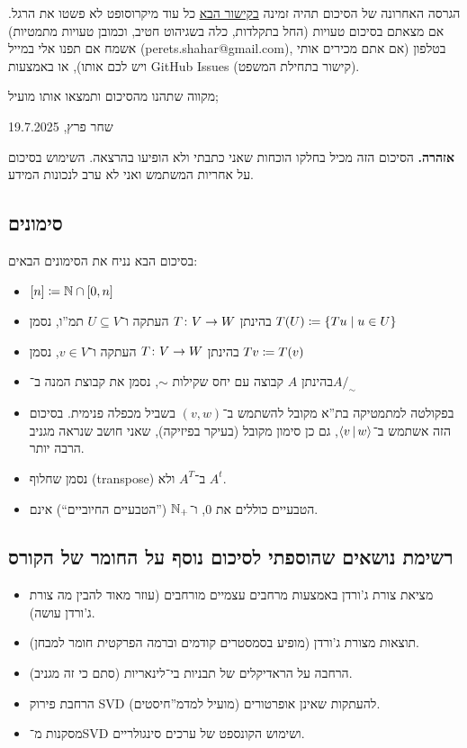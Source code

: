 \documentclass[name=רשימות אלגברה לינארית 2א]{../../../tex/classes/megasumPreamble}
\begin{document}
	הגרסה האחרונה של הסיכום תהיה זמינה \href{https://github.com/Sh-Pe/cs-tau-shpe/tree/master/src/lin-2A/megasum/lin2Amegasum.pdf}{בקישור הבא} כל עוד מיקרוסופט לא פשטו את הרגל. אם מצאתם בסיכום טעויות (החל בתקלדות, כלה בשגיהוט חטיב, וכמובן טעויות מתמטיות) אשמח אם תפנו אלי במייל (perets.shahar@gmail.com), בטלפון (אם אתם מכירים אותי ויש לכם אותו), או באמצעות GitHub Issues (קישור בתחילת המשפט). 
	
	מקווה שתהנו מהסיכום ותמצאו אותו מועיל; 
	
	\hfill שחר פרץ, 19.7.2025
	
	
	\textbf{אזהרה. }הסיכום הזה מכיל בחלקו הוכחות שאני כתבתי ולא הופיעו בהרצאה. השימוש בסיכום על אחריות המשתמש ואני לא ערב לנכונות המידע. 
	
	\vspace{-2pt}
	\subsection{סימונים}
	בסיכום הבא נניח את הסימונים הבאים: 
	\begin{itemize}
		\item \hfil $[n] \coloneqq \mathbb{N} \cap [0, n]$
		\item בהינתן $T \colon V \to W$ העתקה ו־$U \subseteq V$ תמ''ו, נסמן $T(U) \coloneqq \{Tu \mid u \in U\}$
		\item בהינתן $T \colon V \to W$ העתקה ו־$v \in V$, נסמן $Tv \coloneqq T(v)$
		\item בהינתן $A$ קבוצה עם יחס שקילות $\sim$, נסמן את קבוצת המנה ב־$A/_{\sim}$
		\item בפקולטה למתמטיקה בת''א מקובל להשתמש ב־$(v, w)$ בשביל מכפלה פנימית. בסיכום הזה אשתמש ב־$\left \langle v \,\middle|\, w \right \rangle$, גם כן סימון מקובל (בעיקר בפיזיקה), שאני חושב שנראה מגניב הרבה יותר. 
		\item נסמן שחלוף (transpose) ב־$A^{T}$ ולא $A^{t}$. 
		\item הטבעיים כוללים את $0$, ו־$\mathbb{N}_+$ (''הטבעיים החיוביים``) אינם. 
	\end{itemize}
	
	\vspace{-2pt}
	\subsection{רשימת נושאים שהוספתי לסיכום נוסף על החומר של הקורס}
	\begin{itemize}
		\item מציאת צורת ג'ורדן באמצעות מרחבים עצמיים מורחבים (עוזר מאוד להבין מה צורת ג'ורדן עושה). 
		\item תוצאות מצורת ג'ורדן (מופיע בסמסטרים קודמים וברמה הפרקטית חומר למבחן). 
		\item הרחבה על הראדיקלים של תבניות בי־לינאריות (סתם כי זה מגניב). 
		\item הרחבת פירוק SVD להעתקות שאינן אופרטורים (מועיל למדמ''חיסטים). 
		\item מסקנות מ־SVD ושימוש הקונספט של ערכים סינגולריים. 
	\end{itemize}
	
\end{document}
